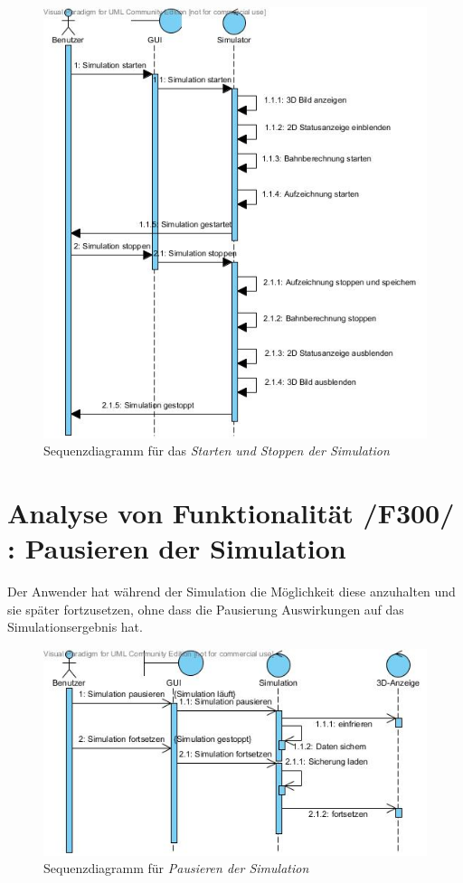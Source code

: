 \begin{figure}
\includegraphics[width=16cm]{bilder/Simulator_Starten_Stoppen}
\caption{Sequenzdiagramm für das \textit{Starten und Stoppen der Simulation}}
\label{labelname}
\end{figure}
\section{Analyse von Funktionalität /F300/ :  Pausieren der Simulation}
Der Anwender hat während der Simulation die Möglichkeit diese anzuhalten und sie später fortzusetzen, ohne dass die Pausierung Auswirkungen auf das Simulationsergebnis hat.
\begin{figure}
\includegraphics[width=\linewidth]{bilder/Pausieren.jpg}
\caption{Sequenzdiagramm für \textit{Pausieren der Simulation}}
\label{labelname}
\end{figure}

